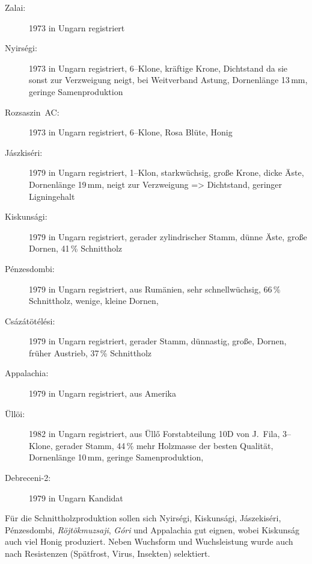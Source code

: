 \documentclass[twocolumn]{scrartcl}
\begin{document}
\begin{description}
  \item[Zalai:] 1973 in Ungarn registriert \citep{keresztesi1983robinie}
  \item[Nyirségi:] 1973 in Ungarn registriert, 6--Klone, kräftige Krone, Dichtstand da sie sonst zur Verzweigung neigt, bei Weitverband Astung, Dornenlänge 13\,mm, geringe Samenproduktion \citep{keresztesi1983robinie,kapusi1995robinie,abri2024dis}
  \item[Rozsaszin~AC:] 1973 in Ungarn registriert, 6--Klone, Rosa Blüte, Honig \citep{keresztesi1983robinie,kapusi1995robinie}
  \item[Jászkiséri:] 1979 in Ungarn registriert, 1--Klon, starkwüchsig, große Krone, dicke Äste, Dornenlänge 19\,mm, neigt zur Verzweigung => Dichtstand, geringer Ligningehalt \citep{keresztesi1983robinie,zsombor1980robinie,kapusi1995robinie,abri2024dis}
  \item[Kiskunsági:] 1979 in Ungarn registriert, gerader zylindrischer Stamm, dünne Äste, große Dornen, 41\,\% Schnittholz \citep{keresztesi1983robinie,zsombor1980robinie}
  \item[Pénzesdombi:] 1979 in Ungarn registriert, aus Rumänien, sehr schnellwüchsig, 66\,\% Schnittholz, wenige, kleine Dornen, \citet{zsombor1980robinie}
  \item[Csázátötélési:] 1979 in Ungarn registriert, gerader Stamm, dünnastig, große, Dornen, früher Austrieb, 37\,\% Schnittholz \citep{zsombor1980robinie}
  \item[Appalachia:] 1979 in Ungarn registriert, aus Amerika
  \item[Üllöi:] 1982 in Ungarn registriert, aus Üllő Forstabteilung 10D von J.~Fila, 3--Klone, gerader Stamm, 44\,\% mehr Holzmasse der besten Qualität, Dornenlänge 10\,mm, geringe Samenproduktion, \citep{bach1983robinie,kapusi1995robinie,abri2024dis,redei2020ulloi}
  \item[Debreceni-2:] 1979 in Ungarn Kandidat \citep{keresztesi1983robinie}
\end{description}

Für die Schnittholzproduktion sollen sich Nyirségi, Kiskunsági, Jászekiséri,
Pénzesdombi, \emph{Röjtökmuzsaji}, \emph{Góri} und Appalachia gut eignen, wobei
Kiskunság auch viel Honig produziert. Neben Wuchsform und Wuchsleistung wurde
auch nach Resistenzen (Spätfrost, Virus, Insekten) selektiert.
\end{document}
